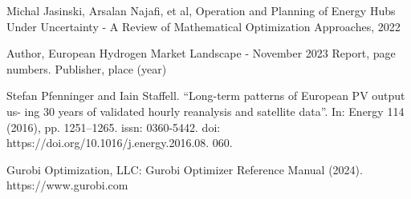 {%




%
%




\begin{thebibliography}{}

Michal Jasinski, Arsalan Najafi, et al,
Operation and Planning of Energy Hubs Under Uncertainty - A Review of Mathematical Optimization Approaches,
2022


Author, European Hydrogen Market Landscape - November 2023 Report, page numbers. Publisher, place (year)


Stefan Pfenninger and Iain Staffell. “Long-term patterns of European PV output us-
ing 30 years of validated hourly reanalysis and satellite data”. In: Energy 114 (2016),
pp. 1251–1265. issn: 0360-5442. doi: https://doi.org/10.1016/j.energy.2016.08.
060.

Gurobi Optimization, LLC: Gurobi Optimizer Reference Manual (2024). https://www.gurobi.com



\end{thebibliography}}
